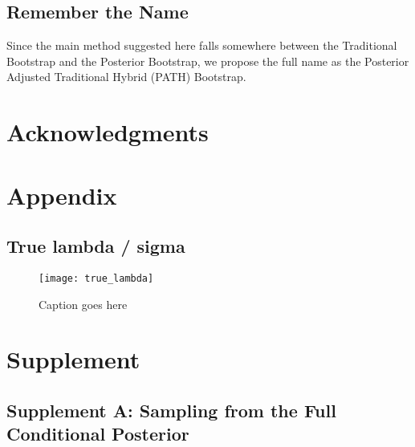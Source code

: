 \subsection{Remember the Name}

Since the main method suggested here falls somewhere between the Traditional Bootstrap and the Posterior Bootstrap, we propose the full name as the Posterior Adjusted Traditional Hybrid (PATH) Bootstrap.

\section*{Acknowledgments}

\section*{Appendix}

\subsection{True lambda / sigma}

\begin{figure}
  \texttt{[image: true\_lambda]}
  \caption{\label{Fig:true_lambda} Caption goes here}
\end{figure}

\section*{Supplement}

\subsection{Supplement A: Sampling from the Full Conditional Posterior}\label{Sup:A}


